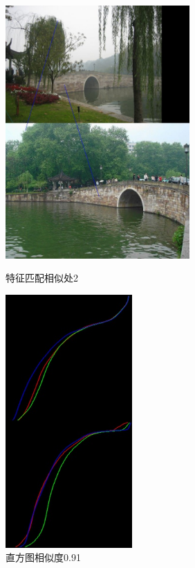 \begin{figure}[htb]
\begin{minipage}[t]{0.5\linewidth}
\centering
\includegraphics[height=3.8in]{西泠.jpg.d/im5sift.jpg}
\caption{特征匹配相似处2}
\label{fig:side:a}
\end{minipage}%
\begin{minipage}[t]{0.5\linewidth}
\centering
\includegraphics[height=3.8in]{西泠.jpg.d/im5hist2.jpg}
\caption{直方图相似度0.91}
\label{fig:side:a}
\end{minipage}%
\end{figure}

\clearpage
